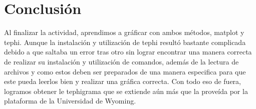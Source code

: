\documentclass{article}
\begin{document}
\section{\huge Conclusión}
Al finalizar la actividad, aprendimos a gráficar con ambos métodos, matplot y tephi. Aunque la instalación y utilización de tephi resultó bastante complicada debido a que saltaba un error tras otro sin lograr encontrar una manera correcta de realizar su instalación y utilización de comandos, además de la lectura de archivos y como estos deben ser preparados de una manera especifica para que este pueda leerlos bien y realizar una gráfica correcta. Con todo eso de fuera, logramos obtener le tephigrama que se extiende aún más que la proveída por la plataforma de la Universidad de Wyoming.
\end{document}
